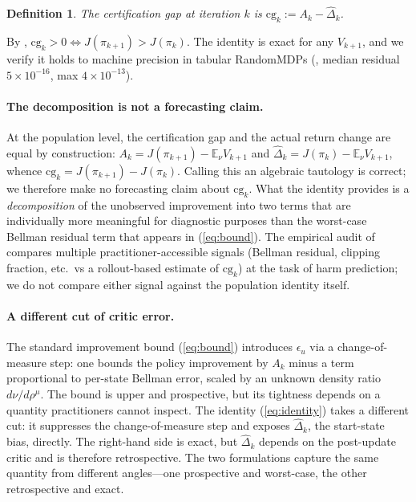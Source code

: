 \documentclass[11pt]{article}
\newtheorem{definition}{Definition}
\begin{document}
\begin{definition}
The \emph{certification gap} at iteration $k$ is $\mathrm{cg}_k := A_k - \hat\Delta_k$.
\end{definition}

By , $\mathrm{cg}_k > 0 \iff J(\pi_{k+1}) > J(\pi_k)$. The identity is exact for any $V_{k+1}$, and we verify it holds to machine precision in tabular RandomMDPs (, median residual $5{\times}10^{-16}$, max $4{\times}10^{-13}$).

\paragraph{The decomposition is not a forecasting claim.}
At the population level, the certification gap and the actual return change are equal by construction: $A_k = J(\pi_{k+1}) - \mathbb{E}_\nu V_{k+1}$ and $\hat\Delta_k = J(\pi_k) - \mathbb{E}_\nu V_{k+1}$, whence $\mathrm{cg}_k = J(\pi_{k+1}) - J(\pi_k)$. Calling this an algebraic tautology is correct; we therefore make no forecasting claim about $\mathrm{cg}_k$. What the identity provides is a \emph{decomposition} of the unobserved improvement into two terms that are individually more meaningful for diagnostic purposes than the worst-case Bellman residual term that appears in (\ref{eq:bound}). The empirical audit of  compares multiple practitioner-accessible signals (Bellman residual, clipping fraction, etc.\ vs a rollout-based estimate of $\mathrm{cg}_k$) at the task of harm prediction; we do not compare either signal against the population identity itself.

\paragraph{A different cut of critic error.}
The standard improvement bound (\ref{eq:bound}) introduces $\epsilon_u$ via a change-of-measure step: one bounds the policy improvement by $A_k$ minus a term proportional to per-state Bellman error, scaled by an unknown density ratio $d\nu/d\rho^\mu$. The bound is upper and prospective, but its tightness depends on a quantity practitioners cannot inspect. The identity (\ref{eq:identity}) takes a different cut: it suppresses the change-of-measure step and exposes $\hat\Delta_k$, the start-state bias, directly. The right-hand side is exact, but $\hat\Delta_k$ depends on the post-update critic and is therefore retrospective. The two formulations capture the same quantity from different angles---one prospective and worst-case, the other retrospective and exact.
\end{document}
